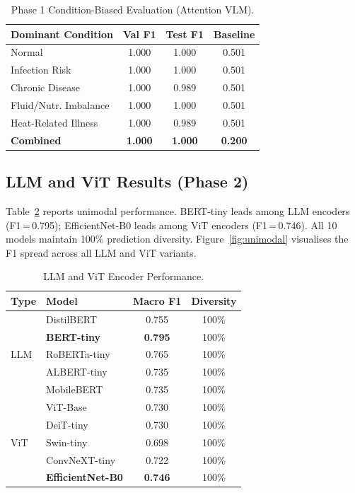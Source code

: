 \documentclass[conference]{IEEEtran}
\begin{document}
\begin{table}[t]
\caption{Phase 1 Condition-Biased Evaluation (Attention VLM).}
\label{tab:phase1}
\centering\footnotesize
\setlength\tabcolsep{4pt}
\begin{tabular}{lccc}
\toprule
\textbf{Dominant Condition} & \textbf{Val F1} & \textbf{Test F1} & \textbf{Baseline}\\
\midrule
Normal                & 1.000 & 1.000 & 0.501 \\
Infection Risk        & 1.000 & 1.000 & 0.501 \\
Chronic Disease       & 1.000 & 0.989 & 0.501 \\
Fluid/Nutr. Imbalance & 1.000 & 1.000 & 0.501 \\
Heat-Related Illness  & 1.000 & 0.989 & 0.501 \\
\midrule
\textbf{Combined}     & \textbf{1.000} & \textbf{1.000} & \textbf{0.200} \\
\bottomrule
\end{tabular}
\end{table}

\subsection{LLM and ViT Results (Phase 2)}

Table~\ref{tab:unimodal} reports unimodal performance. BERT-tiny leads
among LLM encoders (F1\,=\,0.795); EfficientNet-B0 leads among ViT
encoders (F1\,=\,0.746). All 10 models maintain 100\% prediction diversity.
Figure~\ref{fig:unimodal} visualises the F1 spread across all LLM and ViT
variants.

\begin{table}[t]
\caption{LLM and ViT Encoder Performance.}
\label{tab:unimodal}
\centering\footnotesize
\setlength\tabcolsep{4pt}
\begin{tabular}{llcc}
\toprule
\textbf{Type} & \textbf{Model} & \textbf{Macro F1} & \textbf{Diversity}\\
\midrule
\multirow{5}{*}{LLM}
  & DistilBERT    & 0.755 & 100\% \\
  & \cellcolor{llmblue!40}\textbf{BERT-tiny}
                   & \cellcolor{llmblue!40}\textbf{0.795} & \cellcolor{llmblue!40}100\% \\
  & RoBERTa-tiny  & 0.765 & 100\% \\
  & ALBERT-tiny   & 0.735 & 100\% \\
  & MobileBERT    & 0.735 & 100\% \\
\midrule
\multirow{5}{*}{ViT}
  & ViT-Base      & 0.730 & 100\% \\
  & DeiT-tiny     & 0.730 & 100\% \\
  & Swin-tiny     & 0.698 & 100\% \\
  & ConvNeXT-tiny & 0.722 & 100\% \\
  & \cellcolor{vitgreen!40}\textbf{EfficientNet-B0}
                   & \cellcolor{vitgreen!40}\textbf{0.746} & \cellcolor{vitgreen!40}100\% \\
\bottomrule
\end{tabular}
\end{table}
\end{document}
